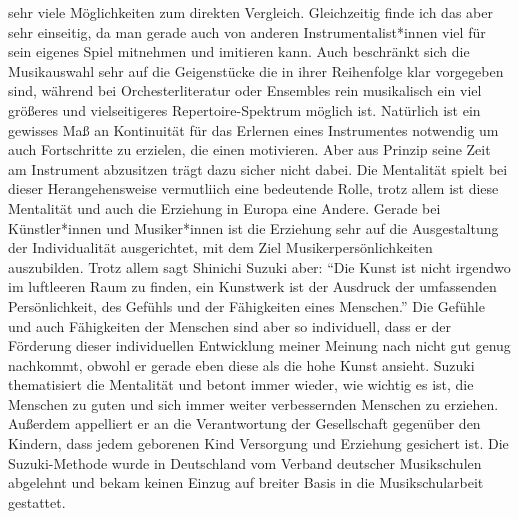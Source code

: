 sehr viele Möglichkeiten zum direkten Vergleich. Gleichzeitig finde ich das aber
sehr einseitig, da man gerade auch von anderen Instrumentalist*innen viel für
sein eigenes Spiel mitnehmen und imitieren kann. Auch beschränkt sich die
Musikauswahl sehr auf die Geigenstücke die in ihrer Reihenfolge klar vorgegeben
sind, während bei Orchesterliteratur oder Ensembles rein musikalisch ein viel
größeres und vielseitigeres Repertoire-Spektrum möglich ist. Natürlich ist ein
gewisses Maß an Kontinuität für das Erlernen eines Instrumentes notwendig um
auch Fortschritte zu erzielen, die einen motivieren. Aber aus Prinzip seine Zeit
am Instrument abzusitzen trägt dazu sicher nicht dabei. Die Mentalität spielt
bei dieser Herangehensweise vermutliich eine bedeutende Rolle, trotz allem ist
diese Mentalität und auch die Erziehung in Europa eine Andere. Gerade bei
Künstler*innen und Musiker*innen ist die Erziehung sehr auf die Ausgestaltung
der Individualität ausgerichtet, mit dem Ziel Musikerpersönlichkeiten
auszubilden. Trotz allem sagt Shinichi Suzuki aber: \enquote{Die Kunst ist nicht
irgendwo im luftleeren Raum zu finden, ein Kunstwerk ist der Ausdruck der
umfassenden Persönlichkeit, des Gefühls und der Fähigkeiten eines Menschen.}
\autocite[103]{suzuki:erziehung_ist_liebe} Die Gefühle und auch Fähigkeiten der
Menschen sind aber so individuell, dass er der Förderung dieser individuellen
Entwicklung meiner Meinung nach nicht gut genug nachkommt, obwohl er gerade eben
diese als die hohe Kunst ansieht. Suzuki thematisiert die Mentalität und betont
immer wieder, wie wichtig es ist, die Menschen zu guten und sich immer weiter
verbessernden Menschen zu erziehen. Außerdem appelliert er an die Verantwortung
der Gesellschaft gegenüber den Kindern, dass jedem geborenen Kind Versorgung und
Erziehung gesichert ist. \autocite[130]{suzuki:erziehung_ist_liebe}
Die Suzuki-Methode wurde in Deutschland vom Verband deutscher Musikschulen
abgelehnt und bekam keinen Einzug auf breiter Basis in die Musikschularbeit gestattet.
\autocite[49]{ernst:die_zukunftsfaehige_musikschule}

